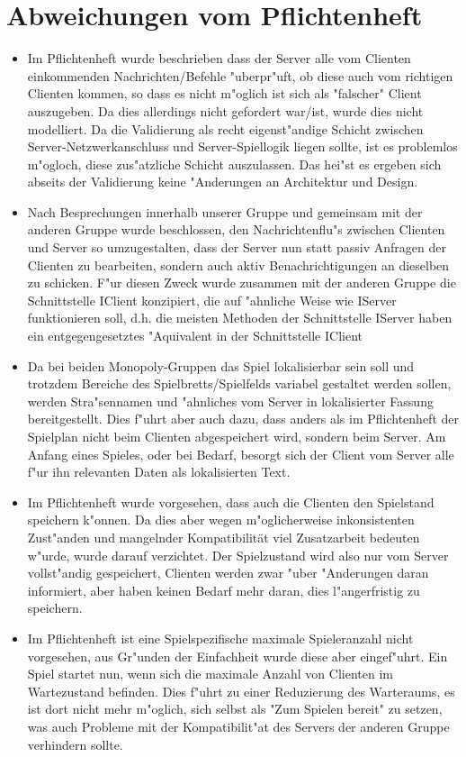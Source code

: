 \documentclass[a4paper,10pt]{article}
\begin{document}
\section{Abweichungen vom Pflichtenheft}
\begin{itemize}
\item Im Pflichtenheft wurde beschrieben dass der Server alle vom Clienten einkommenden Nachrichten/Befehle "uberpr"uft, ob diese auch vom richtigen Clienten kommen, so dass es nicht m"oglich ist sich als "falscher" Client auszugeben. Da dies allerdings nicht gefordert war/ist, wurde dies nicht modelliert. Da die Validierung als recht eigenst"andige Schicht zwischen Server-Netzwerkanschluss und Server-Spiellogik liegen sollte, ist es problemlos m"ogloch, diese zus"atzliche Schicht auszulassen. Das hei"st es ergeben sich abseits der Validierung keine "Anderungen an Architektur und Design.
\item Nach Besprechungen innerhalb unserer Gruppe und gemeinsam mit der anderen Gruppe wurde beschlossen, den Nachrichtenflu"s zwischen Clienten und Server so umzugestalten, dass der Server nun statt passiv Anfragen der Clienten zu bearbeiten, sondern auch aktiv Benachrichtigungen an dieselben zu schicken. F"ur diesen Zweck wurde zusammen mit der anderen Gruppe die Schnittstelle IClient konzipiert, die auf "ahnliche Weise wie IServer funktionieren soll, d.h. die meisten Methoden der Schnittstelle IServer haben ein entgegengesetztes "Aquivalent in der Schnittstelle IClient
\item Da bei beiden Monopoly-Gruppen das Spiel lokalisierbar sein soll und trotzdem Bereiche des Spielbretts/Spielfelds variabel gestaltet werden sollen, werden Stra"sennamen und "ahnliches vom Server in lokalisierter Fassung bereitgestellt. Dies f"uhrt aber auch dazu, dass anders als im Pflichtenheft der Spielplan nicht beim Clienten abgespeichert wird, sondern beim Server. Am Anfang eines Spieles, oder bei Bedarf, besorgt sich der Client vom Server alle f"ur ihn relevanten Daten als lokalisierten Text.
\item Im Pflichtenheft wurde vorgesehen, dass auch die Clienten den Spielstand speichern k"onnen. Da dies aber wegen m"oglicherweise inkonsistenten Zust"anden und mangelnder Kompatibilität viel Zusatzarbeit bedeuten w"urde, wurde darauf verzichtet. Der Spielzustand wird also nur vom Server vollst"andig gespeichert, Clienten werden zwar "uber "Anderungen daran informiert, aber haben keinen Bedarf mehr daran, dies l"angerfristig zu speichern.
\item Im Pflichtenheft ist eine Spielspezifische maximale Spieleranzahl nicht vorgesehen, aus Gr"unden der Einfachheit wurde diese aber eingef"uhrt. Ein Spiel startet nun, wenn sich die maximale Anzahl von Clienten im Wartezustand befinden. Dies f"uhrt zu einer Reduzierung des Warteraums, es ist dort nicht mehr m"oglich, sich selbst als "Zum Spielen bereit" zu setzen, was auch Probleme mit der Kompatibilit"at des Servers der anderen Gruppe verhindern sollte.

\end{itemize}
\end{document}
